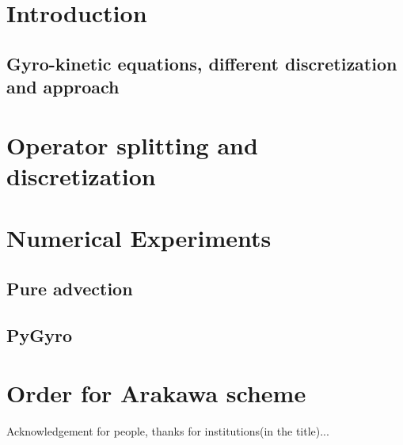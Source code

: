 \documentclass[proc]{edpsmath}
\begin{document}
\maketitle

\section*{Introduction}
	\subsection*{Gyro-kinetic equations, different discretization and approach}
	        
	        \label{sec:introduction}

\section{Operator splitting and discretization}
	\label{sec:splitting_discretization}
	

\section{Numerical Experiments}
	\subsection{Pure advection}
	\subsection{PyGyro}

\appendix
\section{Order for Arakawa scheme}
\label{sec:ara_order}



\begin{acknowledgement}
Acknowledgement for people, thanks for institutions(in the title)...
\end{acknowledgement}



\end{document}
